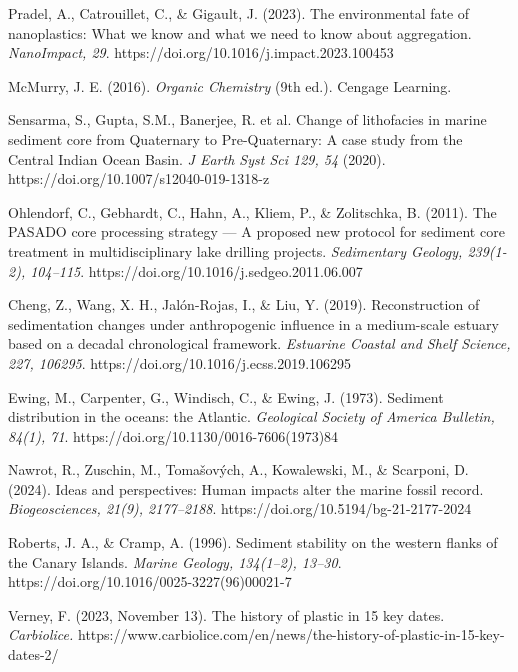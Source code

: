 \documentclass[twocolumn,a4paper,aps,amsmath,amssymb,floatfix,superscriptaddress]{revtex4-2}
\begin{document}
\begin{thebibliography}{99}
		Pradel, A., Catrouillet, C., \& Gigault, J. (2023). The environmental fate of nanoplastics: What we know and what we need to know about aggregation. \textit{NanoImpact, 29}. https://doi.org/10.1016/j.impact.2023.100453
		
		McMurry, J. E. (2016). \textit{Organic Chemistry} (9th ed.). Cengage Learning.
		
		Sensarma, S., Gupta, S.M., Banerjee, R. et al. Change of lithofacies in marine sediment core from Quaternary to Pre-Quaternary: A case study from the Central Indian Ocean Basin. \textit{J Earth Syst Sci 129, 54} (2020). https://doi.org/10.1007/s12040-019-1318-z 
		
		Ohlendorf, C., Gebhardt, C., Hahn, A., Kliem, P., \& Zolitschka, B. (2011). The PASADO core processing strategy — A proposed new protocol for sediment core treatment in multidisciplinary lake drilling projects. \textit{Sedimentary Geology, 239(1-2), 104–115}. https://doi.org/10.1016/j.sedgeo.2011.06.007
		
		Cheng, Z., Wang, X. H., Jalón-Rojas, I., \& Liu, Y. (2019). Reconstruction of sedimentation changes under anthropogenic influence in a medium-scale estuary based on a decadal chronological framework. \textit{Estuarine Coastal and Shelf Science, 227, 106295}. https://doi.org/10.1016/j.ecss.2019.106295
		
		 Ewing, M., Carpenter, G., Windisch, C., \& Ewing, J. (1973). Sediment distribution in the oceans: the Atlantic. \textit{Geological Society of America Bulletin, 84(1), 71}. https://doi.org/10.1130/0016-7606(1973)84
		
		Nawrot, R., Zuschin, M., Tomašových, A., Kowalewski, M., \& Scarponi, D. (2024). Ideas and perspectives: Human impacts alter the marine fossil record. \textit{Biogeosciences, 21(9), 2177–2188}. https://doi.org/10.5194/bg-21-2177-2024
		
		 Roberts, J. A., \& Cramp, A. (1996). Sediment stability on the western flanks of the Canary Islands. \textit{Marine Geology, 134(1–2), 13–30}. https://doi.org/10.1016/0025-3227(96)00021-7
		
		 Verney, F. (2023, November 13). The history of plastic in 15 key dates. \textit{Carbiolice.} https://www.carbiolice.com/en/news/the-history-of-plastic-in-15-key-dates-2/
		

\end{thebibliography}
\end{document}
